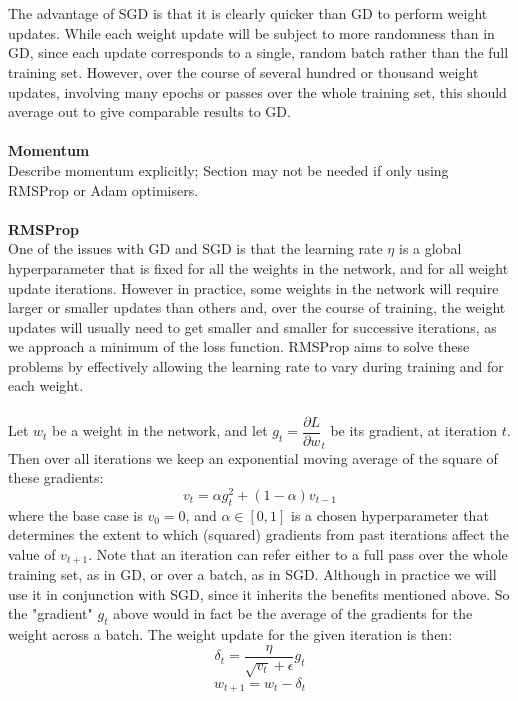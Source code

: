 \documentclass[11pt]{article} %
\theoremstyle{plain}
\theoremstyle{definition}
\begin{document}
\\
\\
\noindent
The advantage of SGD is that it is clearly quicker than GD to perform weight updates. While each weight update will be subject to more randomness than in GD, since each update corresponds to a single, random batch rather than the full training set. However, over the course of several hundred or thousand weight updates, involving many epochs or passes over the whole training set, this should average out to give comparable results to GD. 
\\
\\
\noindent
\textbf{Momentum}
\\
\noindent
[TBD] Describe momentum explicitly; Section may not be needed if only using RMSProp or Adam optimisers.
\\
\\
\noindent
\textbf{RMSProp}
\\
\noindent
One of the issues with GD and SGD is that the learning rate \(\eta\) is a global hyperparameter that is fixed for all the weights in the network, and for all weight update iterations. However in practice, some weights in the network will require larger or smaller updates than others and, over the course of training, the weight updates will usually need to get smaller and smaller for successive iterations, as we approach a minimum of the loss function. RMSProp aims to solve these problems by effectively allowing the learning rate to vary during training and for each weight.
\\
\\
\noindent
Let \(w_t\) be a weight in the network, and let \(g_t = {\dfrac{\partial L}{\partial w}}_t\) be its gradient, at iteration \(t\). Then over all iterations we keep an exponential moving average of the square of these gradients:
\[ v_t = \alpha g_t^2 + (1-\alpha)v_{t-1} \]
where the base case is \(v_0 = 0\), and \( \alpha \in [0,1]\) is a chosen hyperparameter that determines the extent to which (squared) gradients from past iterations affect the value of \(v_{t+1}\). Note that an iteration can refer either to a full pass over the whole training set, as in GD, or over a batch, as in SGD. Although in practice we will use it in conjunction with SGD, since it inherits the benefits mentioned above. So the "gradient" \(g_t\) above would in fact be the average of the gradients for the weight across a batch. The weight update for the given iteration is then:
\[ \delta_t  = \dfrac{\eta}{\sqrt{v_t} + \epsilon} g_t \]
\[ w_{t+1} = w_t - \delta_t \]
\end{document}
